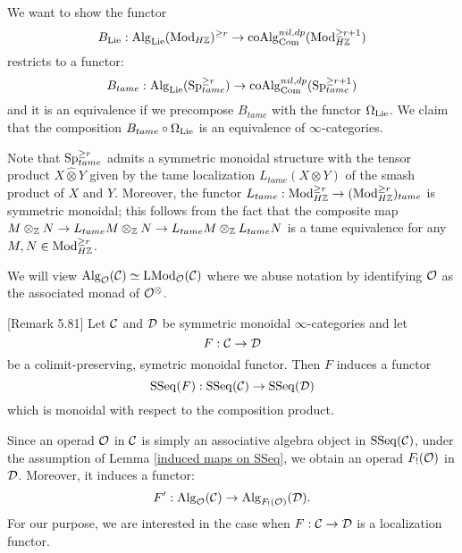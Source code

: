 We want to show the functor 
$$
B_{\operatorname{Lie}}: \operatorname{Alg}_{\operatorname{Lie}}(\operatorname{Mod}_{H{\mathbb{Z}}})^{\geq r} \to \operatorname{coAlg}^{nil, dp}_{\operatorname{Com}}(\operatorname{Mod}_{H{\mathbb{Z}}}^{\geq r+1})
$$ 
restricts to a functor:
$$
B_{tame}: \operatorname{Alg}_{\operatorname{Lie}}(\operatorname{Sp}^{\geq r}_{tame})\to \operatorname{coAlg}^{nil, dp}_{\operatorname{Com}}(\operatorname{Sp}^{\geq r+1}_{tame})
$$
and it is an equivalence if we precompose $B_{tame}$ with the functor $\Omega_{\operatorname{Lie}}$. We claim that the composition $B_{tame}\circ \Omega_{\operatorname{Lie}}$ is an equivalence of $\infty$-categories.

\begin{remark}
\label{symmetric monoidal structure on Mod_Z tame}
	Note that $\operatorname{Sp}^{\geq r}_{tame}$ admits a symmetric monoidal structure with the tensor product $X\hat{\otimes} Y$ given by the tame localization $L_{tame}(X\otimes Y)$ of the smash product of $X$ and $Y$. 
	Moreover, the functor $L_{tame}:\operatorname{Mod}_{H{\mathbb{Z}}}^{\geq r}\to (\operatorname{Mod}_{H{\mathbb{Z}}}^{\geq r})_{tame}$ is symmetric monoidal; this follows from the fact that the composite map $M \otimes_{{\mathbb{Z}}} N \to L_{tame}M\otimes_{{\mathbb{Z}}} N \to L_{tame}M\otimes_{{\mathbb{Z}}} L_{tame}N$ is a tame equivalence for any $M,N\in \operatorname{Mod}_{H{\mathbb{Z}}}^{\geq r}$.
\end{remark}



We will view $\operatorname{Alg}_{{\mathcal{O}}}({\mathcal{C}})\simeq \operatorname{LMod}_{\mathcal{O}}({\mathcal{C}})$ where we abuse notation by identifying ${\mathcal{O}}$ as the associated monad of ${\mathcal{O}}^{\otimes}$. 

\begin{lemma}
\label{induced maps on SSeq}
\cite{Hadrianphdthesis}[Remark 5.81]
Let ${\mathcal{C}}$ and ${\mathcal{D}}$ be symmetric monoidal $\infty$-categories and let 
$$
F: {\mathcal{C}} \to {\mathcal{D}}
$$
be a colimit-preserving, symetric monoidal functor.
Then $F$ induces a functor 
$$
\operatorname{SSeq}(F): \operatorname{SSeq}({\mathcal{C}}) \to \operatorname{SSeq}({\mathcal{D}})
$$
which is monoidal with respect to the composition product.
\end{lemma}	

Since an operad ${\mathcal{O}}$ in ${\mathcal{C}}$ is simply an associative algebra object in $\operatorname{SSeq}({\mathcal{C}})$, under the assumption of Lemma \ref{induced maps on SSeq}, we obtain an operad $F_{!}({\mathcal{O}})$ in ${\mathcal{D}}$. Moreover, it induces a functor:
\[
F' : \operatorname{Alg}_{{\mathcal{O}}}({\mathcal{C}}) \to \operatorname{Alg}_{F_{!}({\mathcal{O}})}({\mathcal{D}}).
\]
For our purpose, we are interested in the case when $F:{\mathcal{C}} \to {\mathcal{D}}$ is a localization functor.


